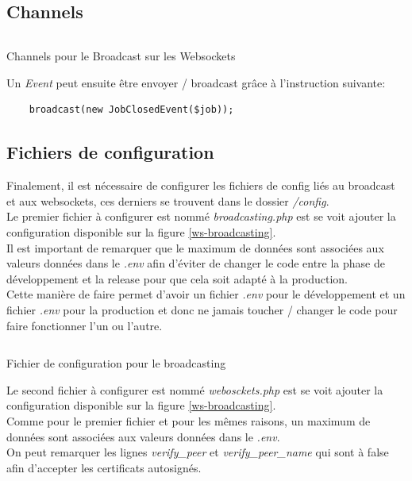 \documentclass[
    iai, %
    il, %
]{heig-tb}
\begin{document}
\subsection{Channels}

\begin{listing}[h]
    \inputminted{php}{assets/code/channels.php}
    \caption{Channels pour le Broadcast sur les Websockets \label{ws-channels}}
\end{listing}

Un \emph{Event} peut ensuite être envoyer / broadcast grâce à l'instruction suivante:
\begin{lstlisting}
    broadcast(new JobClosedEvent($job));
\end{lstlisting}


\subsection{Fichiers de configuration}
Finalement, il est nécessaire de configurer les fichiers de config liés au \Gls{broadcast} et aux \Gls{websockets}, ces derniers se trouvent dans le dossier \emph{/config}. \\
Le premier fichier à configurer est nommé \emph{broadcasting.php} est se voit ajouter la configuration disponible sur la figure \ref{ws-broadcasting}. \\
Il est important de remarquer que le maximum de données sont associées aux valeurs données dans le \emph{.env} afin d'éviter de changer le code entre la phase de développement et la release pour que cela soit adapté à la production. \\
Cette manière de faire permet d'avoir un fichier \emph{.env} pour le développement et un fichier \emph{.env} pour la production et donc ne jamais toucher / changer le code pour faire fonctionner l'un ou l'autre.

\begin{listing}[h]
    \inputminted{php}{assets/code/broadcasting.php}
    \caption{Fichier de configuration pour le broadcasting \label{ws-broadcasting}}
\end{listing}

Le second fichier à configurer est nommé \emph{webosckets.php} est se voit ajouter la configuration disponible sur la figure \ref{ws-broadcasting}. \\
Comme pour le premier fichier et pour les mêmes raisons, un maximum de données sont associées aux valeurs données dans le \emph{.env}. \\
On peut remarquer les lignes \emph{verify\_peer} et \emph{verify\_peer\_name} qui sont à false afin d'accepter les certificats autosignés.
\end{document}
